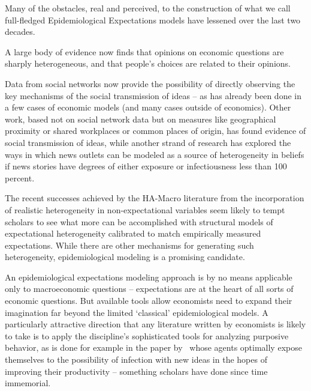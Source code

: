 
\label{conclusion}%

Many of the obstacles, real and perceived, to the construction of what we call full-fledged Epidemiological Expectations models have lessened over the last two decades.

A large body of evidence now finds that opinions on economic questions are sharply heterogeneous, and that people's choices are related to their opinions.

Data from social networks now provide the possibility of directly observing the key mechanisms of the social transmission of ideas -- as  has already been done in a few cases of economic models (and many cases outside of economics).  Other work, based not on social network data but on measures like geographical proximity or shared workplaces or common places of origin, has found evidence of social transmission of ideas, while another strand of research has explored the ways in which news outlets can be modeled as a source of heterogeneity in beliefs if news stories have degrees of either exposure or infectiousness less than 100 percent.

The recent successes achieved by the HA-Macro literature from the incorporation of realistic heterogeneity in non-expectational variables seem likely to tempt scholars to see what more can be accomplished with structural models of expectational heterogeneity calibrated to match empirically measured expectations.  While there are other mechanisms for generating such heterogeneity, epidemiological modeling is a promising candidate.

An epidemiological expectations modeling approach is by no means applicable only to macroeconomic questions -- expectations are at the heart of all sorts of economic questions.  But available tools allow economists need to expand their imagination far beyond the limited `classical' epidemiological models.  A particularly attractive direction that any literature written by economists is likely to take is to apply the discipline's sophisticated tools for analyzing purposive behavior, as is done for example in the paper by~\cite{lucas2014knowledge} whose agents optimally expose themselves to the possibility of infection with new ideas in the hopes of improving their productivity -- something scholars have done since time immemorial.


